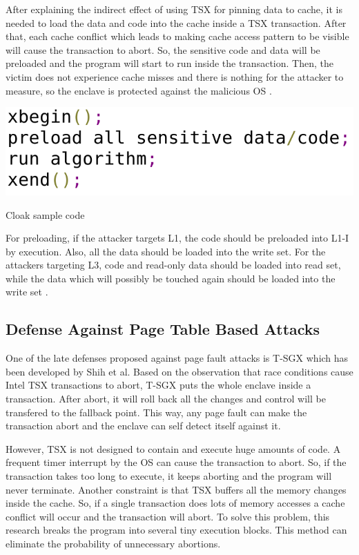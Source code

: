 After explaining the indirect effect of using TSX for pinning data to cache, it is needed to load the data and code into the cache inside a TSX transaction. After that, each cache conflict which leads to making cache access pattern to be visible will cause the transaction to abort. So, the sensitive code and data will be preloaded and the program will start to run inside the transaction. Then, the victim does not experience cache misses and there is nothing for the attacker to measure, so the enclave is protected against the malicious OS \cite{cloak}.

\begin{algorithm}[t]
	\includegraphics[scale=0.25]{images/cloakcode}
	\caption{Cloak sample code \cite{cloak}}
	\label{alg:cloak}
\end{algorithm}

For preloading, if the attacker targets L1, the code should be preloaded into L1-I by execution. Also, all the data should be loaded into the write set. For the attackers targeting L3, code and read-only data should be loaded into read set, while the data which will possibly be touched again should be loaded into the write set \cite{cloak}.

\subsection{Defense Against Page Table Based Attacks}
One of the late defenses proposed against page fault attacks is T-SGX \cite{tsgx} which has been developed by Shih et al. Based on the observation that race conditions cause Intel TSX transactions to abort, T-SGX puts the whole enclave inside a transaction. After abort, it will roll back all the changes and control will be transfered to the fallback point. This way, any page fault can make the transaction abort and the enclave can self detect itself against it.

However, TSX is not designed to contain and execute huge amounts of code. A frequent timer interrupt by the OS can cause the transaction to abort. So, if the transaction takes too long to execute, it keeps aborting and the program will never terminate. Another constraint is that TSX buffers all the memory changes inside the cache. So, if a single transaction does lots of memory accesses a cache conflict will occur and the transaction will abort. To solve this problem, this research breaks the program into several tiny execution blocks. This method can eliminate the probability of unnecessary abortions.

